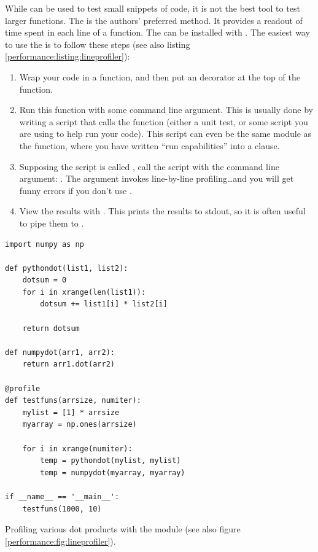 While  can be used to test small snippets of code, it is not the best tool to test larger functions.  The  is the authors' preferred method.  It provides a readout of time spent in each line of a function.  The  can be installed with .  The easiest way to use the  is to follow these steps (see also listing \ref{performance:listing:lineprofiler}):
\begin{enumerate}
  \item Wrap your code in a function, and then put an  decorator at the top of the function.
  \item Run this function with some command line argument.  This is usually done by writing a script that calls the function (either a unit test, or some script you are using to help run your code).  This script can even be the same module as the function, where you have written ``run capabilities'' into a  clause.  
  \item Supposing the script is called , call the script with the command line argument:  .  The  argument invokes line-by-line profiling\ldots and you will get funny errors if you don't use .
  \item View the results with .  This prints the results to stdout, so it is often useful to pipe them to .
\end{enumerate}
\begin{listing}
  \begin{verbatim}
import numpy as np

def pythondot(list1, list2):
    dotsum = 0
    for i in xrange(len(list1)):
        dotsum += list1[i] * list2[i]
    
    return dotsum

def numpydot(arr1, arr2):
    return arr1.dot(arr2)

@profile
def testfuns(arrsize, numiter):
    mylist = [1] * arrsize
    myarray = np.ones(arrsize)

    for i in xrange(numiter):
        temp = pythondot(mylist, mylist)
        temp = numpydot(myarray, myarray)

if __name__ == '__main__':
    testfuns(1000, 10) 
  \end{verbatim}
  \caption{Profiling various dot products with the  module (see also figure \ref{performance:fig:lineprofiler}).}
  \label{performance:listing:lineprofiler}
\end{listing}
